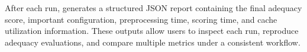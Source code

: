 After each run, \tool generates a structured JSON report containing the final adequacy score, important configuration, preprocessing time, scoring time, and cache utilization information. These outputs allow users to inspect each run, reproduce adequacy evaluations, and compare multiple metrics under a consistent workflow.
